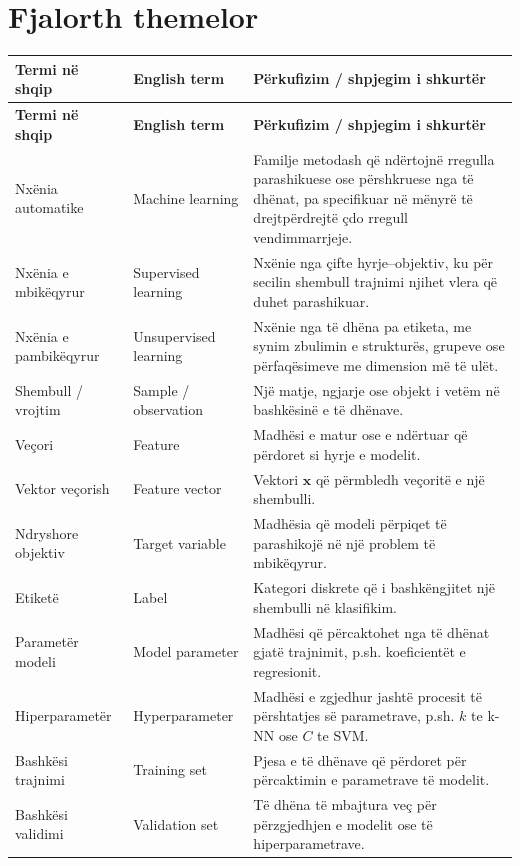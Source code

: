\documentclass[12pt,a4paper,oneside]{book}
\begin{document}
\chapter*{Fjalorth themelor}
\small
\begin{longtable}{p{}p{}p{}}
\toprule
\textbf{Termi në shqip} & \textbf{English term} & \textbf{Përkufizim / shpjegim i shkurtër}\\
\midrule\endfirsthead
\toprule\textbf{Termi në shqip} & \textbf{English term} & \textbf{Përkufizim / shpjegim i shkurtër}\\\midrule\endhead
Nxënia automatike & Machine learning & Familje metodash që ndërtojnë rregulla parashikuese ose përshkruese nga të dhënat, pa specifikuar në mënyrë të drejtpërdrejtë çdo rregull vendimmarrjeje.\\
Nxënia e mbikëqyrur & Supervised learning & Nxënie nga çifte hyrje--objektiv, ku për secilin shembull trajnimi njihet vlera që duhet parashikuar.\\
Nxënia e pambikëqyrur & Unsupervised learning & Nxënie nga të dhëna pa etiketa, me synim zbulimin e strukturës, grupeve ose përfaqësimeve me dimension më të ulët.\\
Shembull / vrojtim & Sample / observation & Një matje, ngjarje ose objekt i vetëm në bashkësinë e të dhënave.\\
Veçori & Feature & Madhësi e matur ose e ndërtuar që përdoret si hyrje e modelit.\\
Vektor veçorish & Feature vector & Vektori $\mathbf{x}$ që përmbledh veçoritë e një shembulli.\\
Ndryshore objektiv & Target variable & Madhësia që modeli përpiqet të parashikojë në një problem të mbikëqyrur.\\
Etiketë & Label & Kategori diskrete që i bashkëngjitet një shembulli në klasifikim.\\
Parametër modeli & Model parameter & Madhësi që përcaktohet nga të dhënat gjatë trajnimit, p.sh. koeficientët e regresionit.\\
Hiperparametër & Hyperparameter & Madhësi e zgjedhur jashtë procesit të përshtatjes së parametrave, p.sh. $k$ te k-NN ose $C$ te SVM.\\
Bashkësi trajnimi & Training set & Pjesa e të dhënave që përdoret për përcaktimin e parametrave të modelit.\\
Bashkësi validimi & Validation set & Të dhëna të mbajtura veç për përzgjedhjen e modelit ose të hiperparametrave.\\

\end{longtable}
\end{document}
